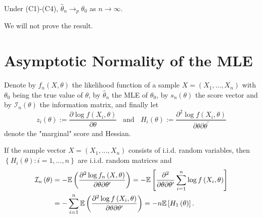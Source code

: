 \documentclass[notes=show]{beamer}
\begin{document}
\begin{frame}%


\begin{theorem}[Consistency]
Under (C1)-(C4), $\hat{\theta}_{n}\rightarrow _{p}\theta _{0}$ as $%
n\rightarrow \infty .$
\end{theorem}

We will not prove the result.

\end{frame}%

\section{Asymptotic Normality of the MLE}

\begin{frame}%


Denote by $f_{n}\left( X,\theta \right) $ the likelihood function of a
sample $X=\left( X_{1},...,X_{n}\right) $ with $\theta _{0}$ being the true
value of $\theta $, by $\hat{\theta}_{n}$ the MLE of $\theta _{0}$, by $%
s_{n}\left( \theta \right) $ the score vector and by $\mathcal{I}_{n}\left(
\theta \right) $ the information matrix, and finally let%
\begin{equation}
z_{i}\left( \theta \right) :=\frac{\partial \log f\left( X_{i},\theta
\right) }{\partial \theta }\;\;\;\text{and\ }\;\;H_{i}\left( \theta \right)
:=\frac{\partial ^{2}\log f\left( X_{i},\theta \right) }{\partial \theta
\partial \theta ^{\prime }}  \label{zH}
\end{equation}%
denote the "marginal" score and Hessian.

If the sample vector $X=\left( X_{1},...,X_{n}\right) $ consists of i.i.d.
random variables, then $\left\{ H_{i}\left( \theta \right)
:i=1,...,n\right\} $ are i.i.d. random matrices and%
\begin{align}
\mathcal{I}_{n}\left( \theta \right) & =-\mathbb{E}\left( \frac{\partial
^{2}\log f_{n}\left( X,\theta \right) }{\partial \theta \partial \theta
^{\prime }}\right) =-\mathbb{E}\left[ \frac{\partial ^{2}}{\partial \theta
\partial \theta ^{\prime }}\sum_{i=1}^{n}\log f\left( X_{i},\theta \right) %
\right]   \notag \\
& =-\sum_{i=1}^{n}\mathbb{E}\left( \frac{\partial ^{2}\log f\left(
X_{i},\theta \right) }{\partial \theta \partial \theta ^{\prime }}\right) =-n%
\mathbb{E}\left[ H_{1}\left( \theta \right) \right] .  \label{2.20}
\end{align}

\end{frame}%
\end{document}
